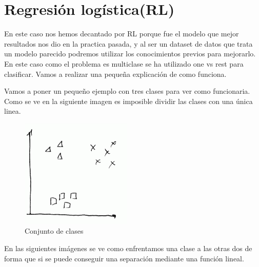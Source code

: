 \documentclass[titlepage]{article}
\begin{document}
	

	\section{Regresión logística(RL)}	
	En este caso nos hemos decantado por RL porque fue el modelo que mejor resultados nos dio en la practica pasada, y al ser un dataset de datos que trata un modelo parecido podremos utilizar los conocimientos previos para mejorarlo. En este caso como el problema es multiclase se ha utilizado one vs rest para clasificar. Vamos a realizar una pequeña explicación de como funciona.
	
	Vamos a poner un pequeño ejemplo con tres clases para ver como funcionaria. Como se ve en la siguiente imagen es imposible dividir las clases con una única linea. 
	\begin{figure}[H]
		\centering
		\includegraphics[width=0.7\linewidth]{../imagenesRL/screenshot002}
		\caption{Conjunto de clases}
		\label{fig:screenshot002}
	\end{figure}
	
	En las siguientes imágenes se ve como enfrentamos una clase a las otras dos de forma que si se puede conseguir una separación mediante una función lineal.
	
	
	
\end{document}
